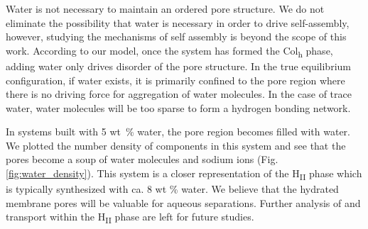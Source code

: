 \documentclass{article}
\begin{document}
  Water is not necessary to maintain an ordered pore structure. We do not
  eliminate the possibility that water is necessary in order to drive
  self-assembly, however, studying the mechanisms of self assembly is beyond the
  scope of this work. According to our model, once the system has formed the
  Col\textsubscript{h} phase, adding water only drives disorder of the pore
  structure. In the true equilibrium configuration, if water exists, it is
  primarily confined to the pore region where there is no driving force for
  aggregation of water molecules. In the case of trace water, water molecules
  will be too sparse to form a hydrogen bonding network.

  In systems built with 5 wt~\% water, the pore region becomes filled with
  water. We plotted the number density of components in this system and see that
  the pores become a soup of water molecules and sodium ions (Fig.
  \ref{fig:water_density}). This system is a closer representation of the
  H\textsubscript{II} phase which is typically synthesized with ca. 8 wt \%
  water. We believe that the hydrated membrane pores will be valuable for aqueous
  separations. Further analysis of and transport within the H\textsubscript{II}
  phase are left for future studies.
\end{document}
